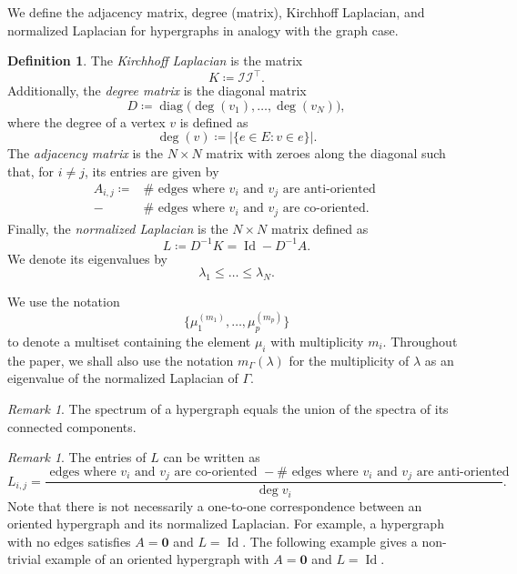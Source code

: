 \documentclass{article}
\DeclareMathOperator{\id}{Id}
\DeclareMathOperator{\diag}{diag}
\theoremstyle{plain}
\theoremstyle{definition}
\newtheorem{definition}[theorem]{Definition}
\theoremstyle{remark}
\newtheorem{remark}[theorem]{Remark}
\begin{document}
We define the adjacency matrix, degree (matrix), Kirchhoff Laplacian, and normalized Laplacian for hypergraphs in analogy with the graph case.
\begin{definition}\label{def:matrices}
    The \emph{Kirchhoff Laplacian} is the matrix
    \begin{equation*}
        K\coloneqq \mathcal I \mathcal I^\top.
    \end{equation*}
    Additionally, the \emph{degree matrix} is the diagonal matrix 
    \[D\coloneqq \diag\bigl(\deg(v_1),\ldots,\deg(v_N)\bigr),\] where the degree of a vertex $v$ is defined as
    \begin{equation*}
        \deg(v)\coloneqq \bigl| \bigl\{ e\in E \colon v\in e \bigr\} \bigr|.
    \end{equation*}
    The \emph{adjacency matrix} is the $N\times N$ matrix with zeroes along the diagonal such that, for $i\neq j$, its entries are given by
    \begin{align*}
    A_{i,j} \coloneqq &\# \text{ edges where $v_i$ and $v_j$ are anti-oriented }\\ - &\# \text{ edges where $v_i$ and $v_j$ are co-oriented.}
    \end{align*}
    Finally, the \emph{normalized Laplacian} is the $N\times N$ matrix defined as
    \[
    L \coloneqq D^{-1}K = \id - D^{-1}A.
    \]
    We denote its eigenvalues by
    \[
    \lambda_1\leq \ldots \leq \lambda_N.
    \]
\end{definition}
We use the notation
\[
\bigl\{ \mu_1^{(m_1)},\ldots,\mu_p^{(m_p)} \bigr\}
\]
to denote a multiset containing the element $\mu_i$ with multiplicity $m_i$. Throughout the paper, we shall also use the notation $m_\Gamma(\lambda)$ for the multiplicity of $\lambda$ as an eigenvalue of the normalized Laplacian of $\Gamma$.
\begin{remark}\label{rmk:spectrumconcomp}
    The spectrum of a hypergraph equals the union of the spectra of its connected components.
\end{remark}
\begin{remark}
The entries of $L$ can be written as
\[
L_{i,j} = \frac{\text{ edges where $v_i$ and $v_j$ are co-oriented } - \# \text{ edges where $v_i$ and $v_j$ are anti-oriented}}{\deg v_i}.
\]
Note that there is not necessarily a one-to-one correspondence between an oriented hypergraph and its normalized Laplacian. For example, a hypergraph with no edges satisfies $A=\boldsymbol{0}$ and $L=\id$. The following example gives a non-trivial example of an oriented hypergraph with $A = \boldsymbol{0}$ and $L = \id$.
\end{remark}
\end{document}
